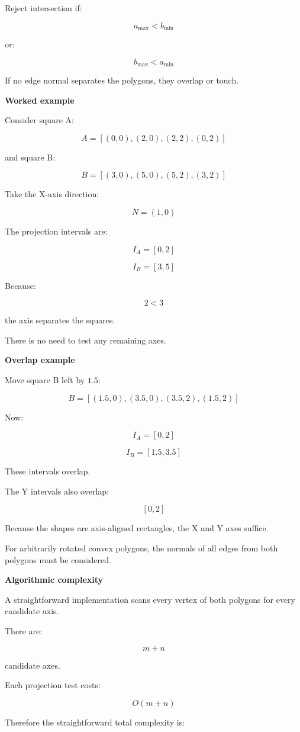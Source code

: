 Reject intersection if:

\[
a_{\max}<b_{\min}
\]

or:

\[
b_{\max}<a_{\min}
\]

If no edge normal separates the polygons, they overlap or touch.

\textbf{Worked example}

Consider square A:

\[
A=[(0,0),(2,0),(2,2),(0,2)]
\]

and square B:

\[
B=[(3,0),(5,0),(5,2),(3,2)]
\]

Take the X-axis direction:

\[
N=(1,0)
\]

The projection intervals are:

\[
I_A=[0,2]
\]

\[
I_B=[3,5]
\]

Because:

\[
2<3
\]

the axis separates the squares.

There is no need to test any remaining axes.

\textbf{Overlap example}

Move square B left by \(1.5\):

\[
B=[(1.5,0),(3.5,0),(3.5,2),(1.5,2)]
\]

Now:

\[
I_A=[0,2]
\]

\[
I_B=[1.5,3.5]
\]

These intervals overlap.

The Y intervals also overlap:

\[
[0,2]
\]

Because the shapes are axis-aligned rectangles, the X and Y axes suffice.

For arbitrarily rotated convex polygons, the normals of all edges from both polygons must be considered.

\textbf{Algorithmic complexity}

A straightforward implementation scans every vertex of both polygons for every candidate axis.

There are:

\[
m+n
\]

candidate axes.

Each projection test costs:

\[
O(m+n)
\]

Therefore the straightforward total complexity is:

